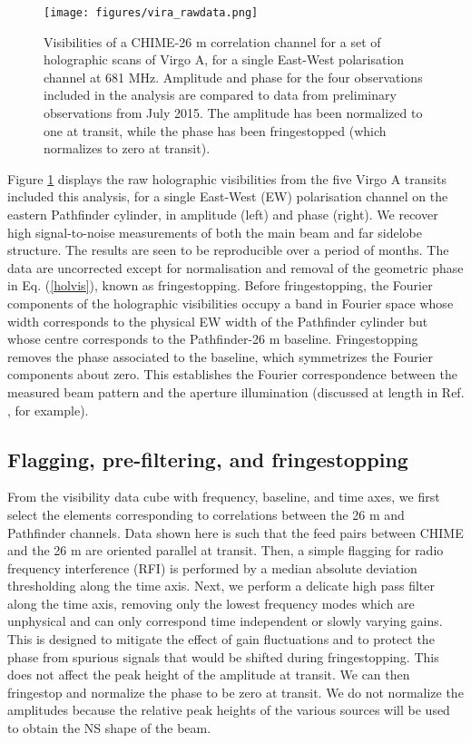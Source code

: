 \begin{figure}[h!]
\centering
\texttt{[image: figures/vira\_rawdata.png]}
\caption{Visibilities of a CHIME-26 m correlation channel for a set of holographic scans of Virgo A, for a single East-West polarisation channel at 681 MHz. Amplitude and phase for the four observations included in the analysis are compared to data from preliminary observations from July 2015. The amplitude has been normalized to one at transit, while the phase has been fringestopped (which normalizes to zero at transit).}
\label{virraw}
\end{figure}

Figure \ref{virraw} displays the raw holographic visibilities from the five Virgo A transits included this analysis, for a single East-West (EW) polarisation channel on the eastern Pathfinder cylinder, in amplitude (left) and phase (right). We recover high signal-to-noise measurements of both the main beam and far sidelobe structure. The results are seen to be reproducible over a period of months. The data are uncorrected except for normalisation and removal of the geometric phase in Eq. (\ref{holvis}), known as fringestopping. Before fringestopping, the Fourier components of the holographic visibilities occupy a band in Fourier space whose width corresponds to the physical EW width of the Pathfinder cylinder but whose centre corresponds to the Pathfinder-26 m baseline. Fringestopping removes the phase associated to the baseline, which symmetrizes the Fourier components about zero. This establishes the Fourier correspondence between the measured beam pattern and the aperture illumination (discussed at length in Ref. \citep{radio2}, for example).

\subsection{Flagging, pre-filtering, and fringestopping}
From the visibility data cube with frequency, baseline, and time axes, we first select the elements corresponding to correlations between the 26 m and Pathfinder channels. Data shown here is such that the feed pairs between CHIME and the 26 m are oriented parallel at transit. Then, a simple flagging for radio frequency interference (RFI) is performed by a median absolute deviation thresholding along the time axis. Next, we perform a delicate high pass filter along the time axis, removing only the lowest frequency modes which are unphysical and can only correspond time independent or slowly varying gains. This is designed to mitigate the effect of gain fluctuations and to protect the phase from spurious signals that would be shifted during fringestopping. This does not affect the peak height of the amplitude at transit. We can then fringestop and normalize the phase to be zero at transit. We do not normalize the amplitudes because the relative peak heights of the various sources will be used to obtain the NS shape of the beam.

